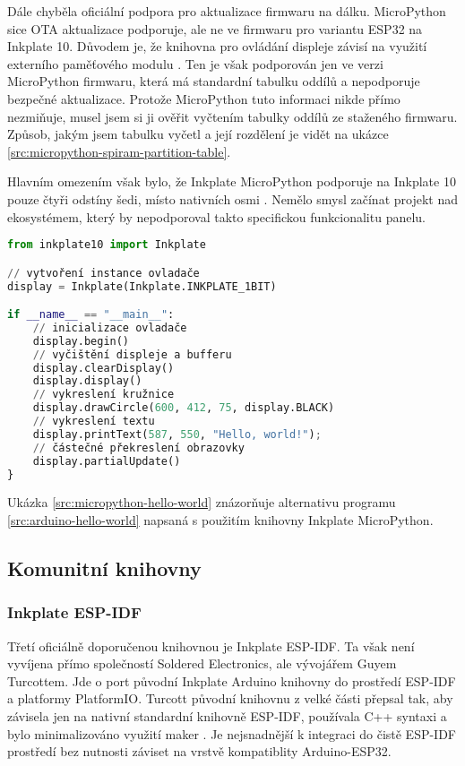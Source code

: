 Dále chyběla oficiální podpora pro aktualizace firmwaru na dálku. MicroPython sice OTA aktualizace podporuje, ale ne ve firmwaru pro variantu ESP32 na Inkplate 10. Důvodem je, že knihovna pro ovládání displeje závisí na využití externího paměťového modulu \cite{SolderedElectronicsInkplatemicropython2024}. Ten je však podporován jen ve verzi MicroPython firmwaru, která má standardní tabulku oddílů a nepodporuje bezpečné aktualizace. Protože MicroPython tuto informaci nikde přímo nezmiňuje, musel jsem si ji ověřit vyčtením tabulky oddílů ze staženého firmwaru. Způsob, jakým jsem tabulku vyčetl a její rozdělení je vidět na ukázce \ref{src:micropython-spiram-partition-table}.

Hlavním omezením však bylo, že Inkplate MicroPython podporuje na Inkplate 10 pouze čtyři odstíny šedi, místo nativních osmi \cite{RenameINKPLATE_2BITINKPLATE_3BIT}. Nemělo smysl začínat projekt nad ekosystémem, který by nepodporoval takto specifickou funkcionalitu panelu.

\begin{lstlisting}[label=src:micropython-hello-world,language=Python,caption={Ilustrační použití knihovny Inkplate MicroPython}]
from inkplate10 import Inkplate

// vytvoření instance ovladače
display = Inkplate(Inkplate.INKPLATE_1BIT)

if __name__ == "__main__":
    // inicializace ovladače
    display.begin()
    // vyčištění displeje a bufferu
    display.clearDisplay()
    display.display()
    // vykreslení kružnice
    display.drawCircle(600, 412, 75, display.BLACK)
    // vykreslení textu
    display.printText(587, 550, "Hello, world!");
    // částečné překreslení obrazovky
    display.partialUpdate()
}
\end{lstlisting}

Ukázka \ref{src:micropython-hello-world} znázorňuje alternativu programu \ref{src:arduino-hello-world} napsaná s použitím knihovny Inkplate MicroPython.

\subsection{Komunitní knihovny}
\subsubsection{Inkplate ESP-IDF}

Třetí oficiálně doporučenou knihovnou je Inkplate ESP-IDF. Ta však není vyvíjena přímo společností Soldered Electronics, ale vývojářem Guyem Turcottem. Jde o port původní Inkplate Arduino knihovny do prostředí ESP-IDF a platformy PlatformIO. Turcott původní knihovnu z velké části přepsal tak, aby závisela jen na nativní standardní knihovně ESP-IDF, používala C++ syntaxi a bylo minimalizováno využití maker \cite{ESPIDFInkPlateREADMEMd}. Je nejsnadnější k integraci do čistě ESP-IDF prostředí bez nutnosti záviset na vrstvě kompatiblity Arduino-ESP32.

